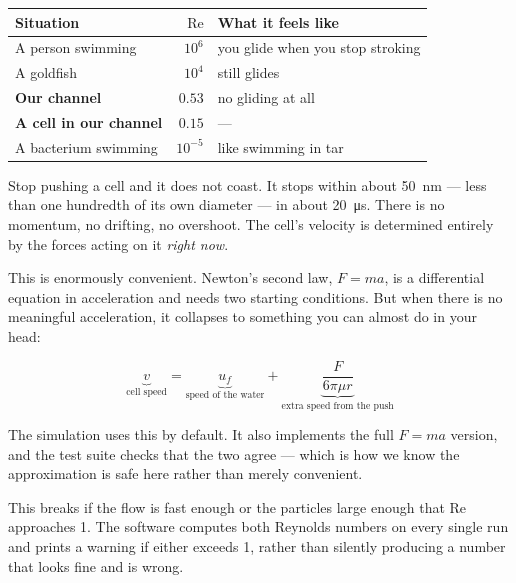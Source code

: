 \documentclass[11pt,a4paper]{article}
\begin{document}
\begin{center}\small
\begin{tabular}{lr>{\raggedright\arraybackslash}p{7.4cm}}
\toprule
\textbf{Situation} & $\mathrm{Re}$ & \textbf{What it feels like} \\
\midrule
A person swimming & $10^{6}$ & you glide when you stop stroking \\
A goldfish & $10^{4}$ & still glides \\
\textbf{Our channel} & $\mathbf{0.53}$ & no gliding at all \\
\textbf{A cell in our channel} & $\mathbf{0.15}$ & --- \\
A bacterium swimming & $10^{-5}$ & like swimming in tar \\
\bottomrule
\end{tabular}
\end{center}

\begin{analogy}
Stop pushing a cell and it does not coast. It stops within about
\SI{50}{\nano\meter} --- less than one hundredth of its own diameter --- in
about \SI{20}{\micro\second}. There is no momentum, no drifting, no
overshoot. The cell's velocity is determined entirely by the forces acting on
it \emph{right now}.
\end{analogy}

This is enormously convenient. Newton's second law, $F = ma$, is a differential
equation in acceleration and needs two starting conditions. But when there is no
meaningful acceleration, it collapses to something you can almost do in your
head:

\begin{equation}
\underbrace{v}_{\text{cell speed}}
= \underbrace{u_f}_{\text{speed of the water}}
+ \underbrace{\frac{F}{6\pi\mu r}}_{\text{extra speed from the push}}
\label{eq:overdamped}
\end{equation}

The simulation uses this by default. It also implements the full
$F=ma$ version, and the test suite checks that the two agree --- which is how
we know the approximation is safe here rather than merely convenient.

\begin{warnbox}
This breaks if the flow is fast enough or the particles large enough that
$\mathrm{Re}$ approaches 1. The software computes both Reynolds numbers on every
single run and prints a warning if either exceeds 1, rather than silently
producing a number that looks fine and is wrong.
\end{warnbox}
\end{document}

